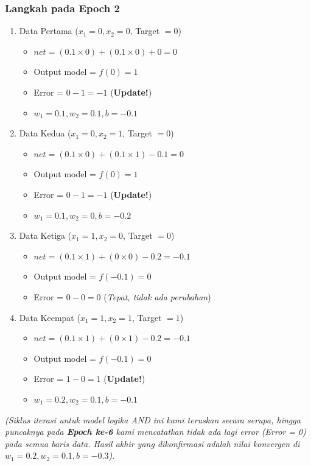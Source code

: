 \documentclass[12pt,a4paper]{article}
\begin{document}
\subsubsection*{Langkah pada Epoch 2}
\begin{enumerate}
    \item Data Pertama ($x_1=0, x_2=0$, Target $=0$)
    \begin{itemize}
        \item $net = (0.1 \times 0) + (0.1 \times 0) + 0 = 0$
        \item Output model = $f(0) = 1$
        \item Error = $0 - 1 = -1$ (\textbf{Update!})
        \item $w_1 = 0.1, w_2 = 0.1, b = -0.1$
    \end{itemize}
    \item Data Kedua ($x_1=0, x_2=1$, Target $=0$)
    \begin{itemize}
        \item $net = (0.1 \times 0) + (0.1 \times 1) - 0.1 = 0$
        \item Output model = $f(0) = 1$
        \item Error = $0 - 1 = -1$ (\textbf{Update!})
        \item $w_1 = 0.1, w_2 = 0, b = -0.2$
    \end{itemize}
    \item Data Ketiga ($x_1=1, x_2=0$, Target $=0$)
    \begin{itemize}
        \item $net = (0.1 \times 1) + (0 \times 0) - 0.2 = -0.1$
        \item Output model = $f(-0.1) = 0$
        \item Error = $0 - 0 = 0$ (\textit{Tepat, tidak ada perubahan})
    \end{itemize}
    \item Data Keempat ($x_1=1, x_2=1$, Target $=1$)
    \begin{itemize}
        \item $net = (0.1 \times 1) + (0 \times 1) - 0.2 = -0.1$
        \item Output model = $f(-0.1) = 0$
        \item Error = $1 - 0 = 1$ (\textbf{Update!})
        \item $w_1 = 0.2, w_2 = 0.1, b = -0.1$
    \end{itemize}
\end{enumerate}

\textit{(Siklus iterasi untuk model logika AND ini kami teruskan secara serupa, hingga puncaknya pada \textbf{Epoch ke-6} kami mencatatkan tidak ada lagi error (Error = 0) pada semua baris data. Hasil akhir yang dikonfirmasi adalah nilai konvergen di $w_1=0.2, w_2=0.1, b=-0.3$)}.
\end{document}
